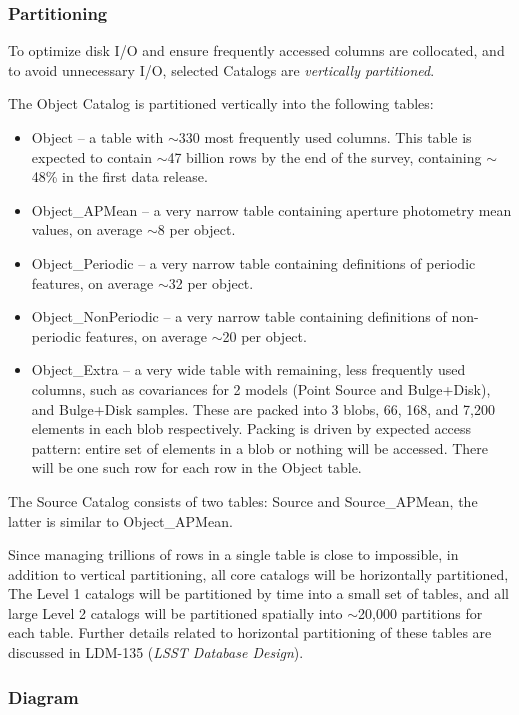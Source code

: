\documentclass[DM,toc]{lsstdoc}
\begin{document}
\subsubsection{Partitioning}

To optimize disk I/O and ensure frequently accessed columns are collocated, and to avoid unnecessary I/O, selected Catalogs are \textit{vertically partitioned}.

The Object Catalog is partitioned vertically into the following tables: 

\begin{itemize}
  \item Object – a table with $\sim$330 most frequently used columns. This table is expected to contain $\sim$47 billion rows by the end of the survey, containing $\sim$48\% in the first data release.
  \item Object\_APMean – a very narrow table containing aperture photometry mean values, on average $\sim$8 per object.
  \item Object\_Periodic – a very narrow table containing definitions of periodic features, on average $\sim$32 per object.
  \item Object\_NonPeriodic – a very narrow table containing definitions of non-periodic features, on average $\sim$20 per object.
  \item Object\_Extra – a very wide table with remaining, less frequently used columns, such as covariances for 2 models (Point Source and Bulge+Disk), and Bulge+Disk samples. These are packed into 3 blobs, 66, 168, and 7,200 elements in each blob respectively. Packing is driven by expected access pattern: entire set of elements in a blob or nothing will be accessed. There will be one such row for each row in the Object table.  
\end{itemize}

The Source Catalog consists of two tables: Source and Source\_APMean, the latter is similar to Object\_APMean.

Since managing trillions of rows in a single table is close to impossible, in addition to vertical partitioning, all core catalogs will be horizontally partitioned, The Level 1 catalogs will be partitioned by time into a small set of tables, and all large Level 2 catalogs will be partitioned spatially into $\sim$20,000 partitions for each table. Further details related to horizontal partitioning of these tables are discussed in LDM-135 (\textit{LSST Database Design}).

\subsubsection{Diagram}
\end{document}
